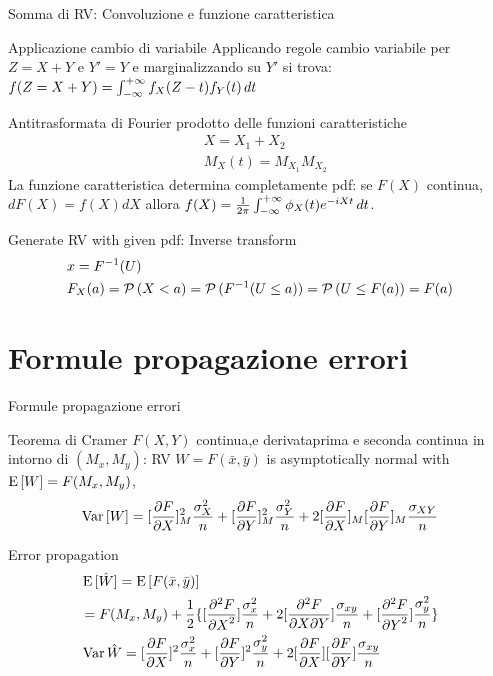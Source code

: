 \documentclass[asd-beamer.tex]{subfiles}
\begin{document}
\begin{frame}{Somma di RV: Convoluzione e funzione caratteristica}
\begin{block}{Applicazione cambio di variabile}
Applicando regole cambio variabile per $Z=X+Y$ e $Y'=Y$ e marginalizzando su $Y'$ si trova: $f(Z=X+Y)=\intsinf{}f_X(Z-t)f_Y(t)\,dt$
\end{block}
\begin{block}{Antitrasformata di Fourier prodotto delle funzioni caratteristiche}
\begin{align*}
&X=X_1+X_2\\
&M_X(t)=M_{X_1}M_{X_2}
\end{align*}
La funzione caratteristica determina completamente pdf: se $F(X)$ continua, $dF(X)=f(X)dX$ allora $f(X)=\frac{1}{2\pi}\intsinf{}\phi_X(t)\exp{-iXt}\,dt$.
\end{block}
\begin{block}{Generate RV with given pdf: Inverse transform}
\begin{align*}
&x=\invers{F}(U)\\
&F_X(a)=\prob{(X<a)}=\prob{(\invers{F}(U\leq a))}=\prob{(U\leq F(a))}=F(a)
\end{align*}
\end{block}
\end{frame}

\section{Formule propagazione errori}

\begin{frame}{Formule propagazione errori}
\begin{block}{Teorema di Cramer}
$F(X,Y)$ continua,e derivataprima e seconda continua in intorno di $(M_x,M_y)$: RV $W=F(\bar{x},\bar{y})$ is asymptotically normal with $\E{[W]}=F(M_x,M_y)$,
\[\var{[W]}=[\PDy{X}{F}]_M^2\frac{\sigma^2_X}{n}+[\PDy{Y}{F}]_M^2\frac{\sigma^2_Y}{n}+2[\PDy{X}{F}]_M[\PDy{Y}{F}]_M\frac{\sigma_{XY}}{n}\]
\end{block}
\begin{block}{Error propagation}
\begin{align*}
&\E{[\hat{W}]}=\E{[F(\bar{x},\bar{y})]}\\
&=F(M_x,M_y)+\frac{1}{2}\{[\PtwoDy{X}{F}]\frac{\sigma_x^2}{n}+2[\PtwoMDy{X}{Y}{F}]\frac{\sigma_{xy}}{n}+[\PtwoDy{Y}{F}]\frac{\sigma_y^2}{n}\}\\
&\var{\hat{W}}=[\PDy{X}{F}]^2\frac{\sigma_x^2}{n}+[\PDy{Y}{F}]^2\frac{\sigma_y^2}{n}+2[\PDy{X}{F}][\PDy{Y}{F}]\frac{\sigma_{xy}}{n}
\end{align*}
\end{block}
\end{frame}
\end{document}
